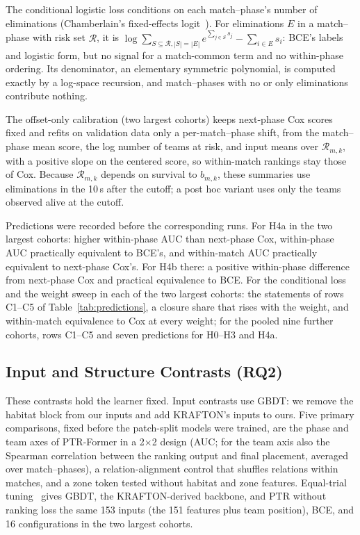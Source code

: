 \documentclass[sigconf,anonymous]{acmart}
\begin{document}
The conditional logistic loss conditions on each match--phase's number of eliminations (Chamberlain's fixed-effects logit~\cite{Chamberlain80}). For eliminations $E$ in a match--phase with risk set $\mathcal{R}$, it is $\log\sum_{S\subseteq\mathcal{R},|S|=|E|}e^{\sum_{j\in S}s_j}-\sum_{i\in E}s_i$: BCE's labels and logistic form, but no signal for a match-common term and no within-phase ordering. Its denominator, an elementary symmetric polynomial, is computed exactly by a log-space recursion, and match--phases with no or only eliminations contribute nothing.

The offset-only calibration (two largest cohorts) keeps next-phase Cox scores fixed and refits on validation data only a per-match--phase shift, from the match--phase mean score, the log number of teams at risk, and input means over $\mathcal{R}_{m,k}$, with a positive slope on the centered score, so within-match rankings stay those of Cox. Because $\mathcal{R}_{m,k}$ depends on survival to $b_{m,k}$, these summaries use eliminations in the 10\,s after the cutoff; a post hoc variant uses only the teams observed alive at the cutoff.

Predictions were recorded before the corresponding runs. For H4a in the two largest cohorts: higher within-phase AUC than next-phase Cox, within-phase AUC practically equivalent to BCE's, and within-match AUC practically equivalent to next-phase Cox's. For H4b there: a positive within-phase difference from next-phase Cox and practical equivalence to BCE. For the conditional loss and the weight sweep in each of the two largest cohorts: the statements of rows C1--C5 of Table~\ref{tab:predictions}, a closure share that rises with the weight, and within-match equivalence to Cox at every weight; for the pooled nine further cohorts, rows C1--C5 and seven predictions for H0--H3 and H4a.

\subsection{Input and Structure Contrasts (RQ2)}
\label{sec:method:contrasts}
These contrasts hold the learner fixed. Input contrasts use GBDT: we remove the habitat block from our inputs and add KRAFTON's inputs to ours. Five primary comparisons, fixed before the patch-split models were trained, are the phase and team axes of PTR-Former in a 2$\times$2 design (AUC; for the team axis also the Spearman correlation between the ranking output and final placement, averaged over match--phases), a relation-alignment control that shuffles relations within matches, and a zone token tested without habitat and zone features. Equal-trial tuning~\cite{Bergstra12,Cawley10} gives GBDT, the KRAFTON-derived backbone, and PTR without ranking loss the same 153 inputs (the 151 features plus team position), BCE, and 16 configurations in the two largest cohorts.
\end{document}
